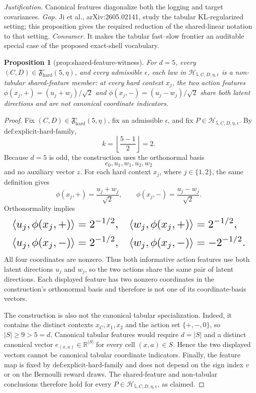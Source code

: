 \documentclass{article}
\newtheorem{proposition}{Proposition}
\begin{document}
\par\smallskip\noindent \textit{Justification.} Canonical features diagonalize both the logging and target covariances. \textit{Gap.} Ji et al., arXiv:2605.02141, study the tabular KL-regularized setting; this proposition gives the required reduction of the shared-linear notation to that setting. \textit{Consumer.} It makes the tabular fast--slow frontier an auditable special case of the proposed exact-shell vocabulary.

\begin{proposition}[prop:shared-feature-witness]\label{prop:shared-feature-witness}
For \(d=5\), every \((C,D)\in\mathfrak F_{\mathrm{hard}}^\circ(5,\eta)\), and every admissible \(\epsilon\), each law in \(\mathcal H_{5,C,D,\eta,\epsilon}\) is a non-tabular shared-feature member: at every hard context \(x_j\), the two action features \(\phi(x_j,+)=(u_j+w_j)/\sqrt2\) and \(\phi(x_j,-)=(u_j-w_j)/\sqrt2\) share both latent directions and are not canonical coordinate indicators.
\end{proposition}
\begin{proof}
Fix \((C,D)\in\mathfrak F_{\mathrm{hard}}^\circ(5,\eta)\), fix an admissible \(\epsilon\), and fix \(P\in\mathcal H_{5,C,D,\eta,\epsilon}\). By \(\text{def:explicit-hard-family}\),
\[
k=\left\lfloor\frac{5-1}{2}\right\rfloor=2.
\]
Because \(d=5\) is odd, the construction uses the orthonormal basis
\[
e_0,u_1,w_1,u_2,w_2
\]
and no auxiliary vector \(z\). For each hard context \(x_j\), where \(j\in\{1,2\}\), the same definition gives
\[
\phi(x_j,+)=\frac{u_j+w_j}{\sqrt2},
\qquad
\phi(x_j,-)=\frac{u_j-w_j}{\sqrt2}.
\]
Orthonormality implies
\[
\makebox[\linewidth][c]{\resizebox{0.98\linewidth}{!}{\(\displaystyle \begin{aligned}
\langle u_j,\phi(x_j,+)\rangle&=2^{-1/2},&
\langle w_j,\phi(x_j,+)\rangle&=2^{-1/2},\\
\langle u_j,\phi(x_j,-)\rangle&=2^{-1/2},&
\langle w_j,\phi(x_j,-)\rangle&=-2^{-1/2}.
\end{aligned}\)}}
\]
All four coordinates are nonzero. Thus both informative action features use both latent directions \(u_j\) and \(w_j\), so the two actions share the same pair of latent directions. Each displayed feature has two nonzero coordinates in the construction's orthonormal basis and therefore is not one of its coordinate-basis vectors.

The construction is also not the canonical tabular specialization. Indeed, it contains the distinct contexts \(x_C,x_1,x_2\) and the action set \(\{+,-,0\}\), so \(|S|\ge9>5=d\). Canonical tabular features would require \(d=|S|\) and a distinct canonical vector \(e_{(x,a)}\in\mathbb R^{|S|}\) for every cell \((x,a)\in S\). Hence the two displayed vectors cannot be canonical tabular coordinate indicators. Finally, the feature map is fixed by \(\text{def:explicit-hard-family}\) and does not depend on the sign index \(v\) or on the Bernoulli reward draws. The shared-feature and non-tabular conclusions therefore hold for every \(P\in\mathcal H_{5,C,D,\eta,\epsilon}\), as claimed.
\end{proof}
\end{document}
